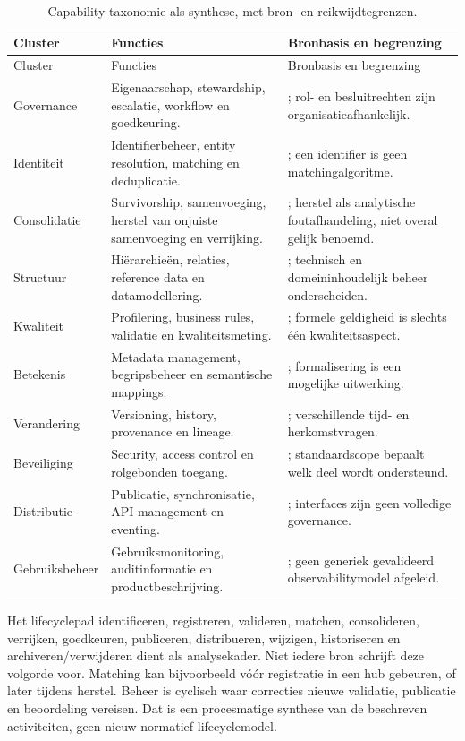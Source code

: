 \begin{longtable}{@{}P{.19\linewidth}P{.43\linewidth}P{.30\linewidth}@{}}
\caption{Capability-taxonomie als synthese, met bron- en reikwijdtegrenzen.}\label{tab:capabilities}\\
\toprule Cluster & Functies & Bronbasis en begrenzing \\\midrule\endfirsthead
\toprule Cluster & Functies & Bronbasis en begrenzing \\\midrule\endhead
Governance & Eigenaarschap, stewardship, escalatie, workflow en goedkeuring. & \textcite{L20,L07}; rol- en besluitrechten zijn organisatieafhankelijk. \\
Identiteit & Identifierbeheer, entity resolution, matching en deduplicatie. & \textcite{L21,L29,S38}; een identifier is geen matchingalgoritme. \\
Consolidatie & Survivorship, samenvoeging, herstel van onjuiste samenvoeging en verrijking. & \textcite{P01,L22}; herstel als analytische foutafhandeling, niet overal gelijk benoemd. \\
Structuur & Hiërarchieën, relaties, reference data en datamodellering. & \textcite{P01,L19,S13}; technisch en domeininhoudelijk beheer onderscheiden. \\
Kwaliteit & Profilering, business rules, validatie en kwaliteitsmeting. & \textcite{L19,S32,S34}; formele geldigheid is slechts één kwaliteitsaspect. \\
Betekenis & Metadata management, begripsbeheer en semantische mappings. & \textcite{S08,S14,L18}; formalisering is een mogelijke uitwerking. \\
Verandering & Versioning, history, provenance en lineage. & \textcite{L14,S33,L20}; verschillende tijd- en herkomstvragen. \\
Beveiliging & Security, access control en rolgebonden toegang. & \textcite{L20,S21}; standaardscope bepaalt welk deel wordt ondersteund. \\
Distributie & Publicatie, synchronisatie, API management en eventing. & \textcite{P02,S19,S22}; interfaces zijn geen volledige governance. \\
Gebruiksbeheer & Gebruiksmonitoring, auditinformatie en productbeschrijving. & \textcite{L20,S51}; geen generiek gevalideerd observabilitymodel afgeleid. \\
\bottomrule
\end{longtable}

Het lifecyclepad identificeren, registreren, valideren, matchen, consolideren, verrijken, goedkeuren, publiceren, distribueren, wijzigen, historiseren en archiveren/verwijderen dient als analysekader. Niet iedere bron schrijft deze volgorde voor. Matching kan bijvoorbeeld vóór registratie in een hub gebeuren, of later tijdens herstel. Beheer is cyclisch waar correcties nieuwe validatie, publicatie en beoordeling vereisen. Dat is een procesmatige synthese van de beschreven activiteiten, geen nieuw normatief lifecyclemodel. \parencite{L20,P01,P02}

